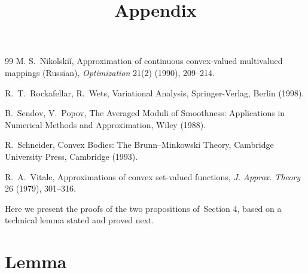 \documentclass[final,3p,mathptmx]{article}%
\begin{document}
{{{\begin{thebibliography}{99}
M. S.~Nikolskiĭ,  
Approximation of continuous convex-valued multivalued mappings (Russian), 
\textit{Optimization} 21(2) (1990), 209--214.
%

%


%


R.~T.~Rockafellar, R.~Wets,
Variational Analysis, Springer-Verlag, Berlin (1998).
%

B.~Sendov, V.~Popov, The Averaged Moduli of Smoothness: Applications in Numerical Methods and Approximation, Wiley (1988).
%

R.~Schneider,
Convex Bodies: The Brunn--Minkowski Theory, Cambridge University Press, Cambridge (1993).
%


R.~A.~Vitale,
Approximations of convex set-valued functions,
\textit{J. Approx. Theory}  26 (1979), 301--316.
%



\end{thebibliography}
\medskip


	

\medskip



\appendix
{\Large\bf\title{Appendix}}
\smallskip

Here we present the proofs of the two propositions of~Section 4, based on a technical lemma stated and proved next.

\section{Lemma}

}}}
\end{document}
